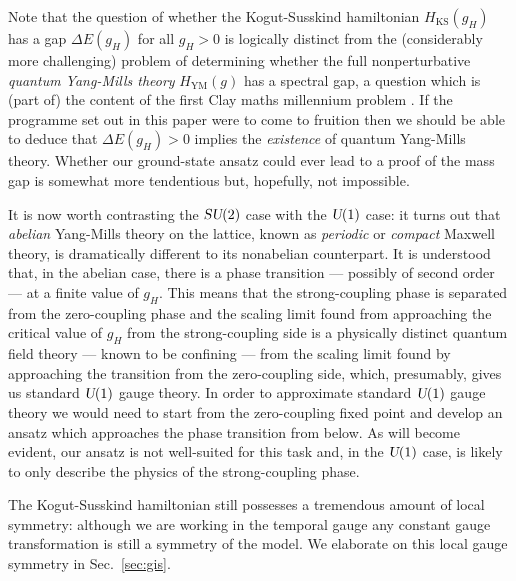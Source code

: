 \documentclass[twocolumn,lengthcheck,superscriptaddress]{revtex4-1}
\def\su2{\textsl{SU}(2)}
\def\uone{\textsl{U}(1)}
\theoremstyle{definition}
\theoremstyle{remark}
\begin{document}
Note that the question of whether the Kogut-Susskind hamiltonian $H_{\text{KS}}(g_H)$ has a gap $\Delta E(g_H)$ for all $g_H > 0$ is logically distinct from the (considerably more challenging) problem of determining whether the full nonperturbative \emph{quantum Yang-Mills theory} $H_{\text{YM}}(g)$ has a spectral gap, a question which is (part of) the content of the first Clay maths millennium problem \cite{cmproblem:1st}. If the programme set out in this paper were to come to fruition then we should be able to deduce that $\Delta E(g_H) >0$ implies the \emph{existence} of quantum Yang-Mills theory. Whether our ground-state ansatz could ever lead to a proof of the mass gap is somewhat more tendentious but, hopefully, not impossible.

It is now worth contrasting the $\su2$ case with the $\uone$ case: it turns out that \emph{abelian} Yang-Mills theory on the lattice, known as \emph{periodic} or \emph{compact} Maxwell theory, is dramatically different \cite{polyakov:1975a, villain:1975a, polyakov:1977a, banks:1977a, peskin:1978a, kogut:2004a} to its nonabelian counterpart. It is understood that, in the abelian case, there is a phase transition --- possibly of second order --- at a finite value of $g_H$. This means that the strong-coupling phase is separated from the zero-coupling phase and the scaling limit found from approaching the critical value of $g_H$ from the strong-coupling side is a physically distinct quantum field theory --- known to be confining --- from the scaling limit found by approaching the transition from the zero-coupling side, which, presumably, gives us standard $\uone$ gauge theory. In order to approximate standard $\uone$ gauge theory we would need to start from the zero-coupling fixed point and develop an ansatz which approaches the phase transition from below. As will become evident, our ansatz is not well-suited for this task and, in the $\uone$ case, is likely to only describe the physics of the strong-coupling phase. 

The Kogut-Susskind hamiltonian still possesses a tremendous amount of local symmetry: although we are working in the temporal gauge any constant gauge transformation is still a symmetry of the model. We elaborate on this local gauge symmetry in Sec.~\ref{sec:gis}.
\end{document}
